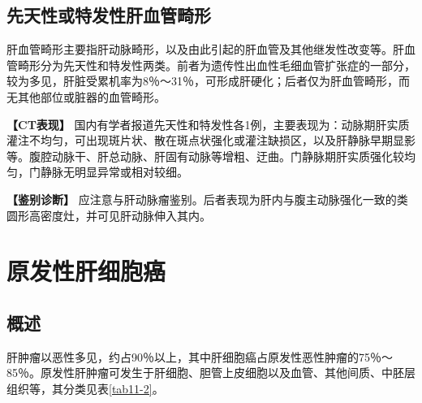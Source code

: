 \subsection{先天性或特发性肝血管畸形}

肝血管畸形主要指肝动脉畸形，以及由此引起的肝血管及其他继发性改变等。肝血管畸形分为先天性和特发性两类。前者为遗传性出血性毛细血管扩张症的一部分，较为多见，肝脏受累机率为8％～31％，可形成肝硬化；后者仅为肝血管畸形，而无其他部位或脏器的血管畸形。

\textbf{【CT表现】}
国内有学者报道先天性和特发性各1例，主要表现为：动脉期肝实质灌注不均匀，可出现斑片状、散在斑点状强化或灌注缺损区，以及肝静脉早期显影等。腹腔动脉干、肝总动脉、肝固有动脉等增粗、迂曲。门静脉期肝实质强化较均匀，门静脉无明显异常或相对较细。

\textbf{【鉴别诊断】}
应注意与肝动脉瘤鉴别。后者表现为肝内与腹主动脉强化一致的类圆形高密度灶，并可见肝动脉伸入其内。

\section{原发性肝细胞癌}

\subsection{概述}

肝肿瘤以恶性多见，约占90％以上，其中肝细胞癌占原发性恶性肿瘤的75％～85％。原发性肝肿瘤可发生于肝细胞、胆管上皮细胞以及血管、其他间质、中胚层组织等，其分类见表\ref{tab11-2}。

